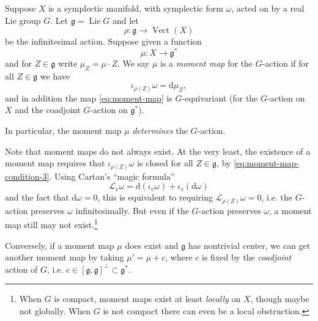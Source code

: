 \documentclass[12pt,letterpaper,reqno]{article}
\numberwithin{equation}{section}
\newcommand{\fg}{{\mathfrak g}}
\newcommand{\cL}{\ensuremath{\mathcal L}}
\newcommand{\de}{\mathrm{d}}
\newcommand{\ti}[1]{\textit{#1}}
\DeclareMathOperator{\Lie}{Lie}
\DeclareMathOperator{\Vect}{Vect}
\begin{document}
\begin{defn} \label{def:moment-map}
Suppose $X$ is a symplectic manifold, with symplectic form $\omega$,
acted on by a real Lie group $G$. Let $\fg = \Lie G$ and let
\begin{equation}
\rho: \fg \to \Vect(X)
\end{equation}
be the infinitesimal action.
Suppose given a function
\begin{equation} \label{eq:moment-map}
 \mu: X \to \fg^*
\end{equation}
and for $Z \in \fg$ write $\mu_Z = \mu \cdot Z$.
We say $\mu$ is a \ti{moment map} for the $G$-action if
for all $Z \in \fg$ we have
\begin{equation} \label{eq:moment-map-condition-3}
  \iota_{\rho(Z)} \omega = \de \mu_Z,
\end{equation}
and in addition the map \eqref{eq:moment-map} is $G$-equivariant
(for the $G$-action on $X$ and the coadjoint $G$-action on $\fg^*$).
\end{defn}
In particular, the moment map $\mu$
\ti{determines} the $G$-action.

Note that moment maps do not always exist.
At the very least, the existence of a moment
map requires that $\iota_{\rho(Z)} \omega$ is closed
for all $Z \in \fg$, by \eqref{eq:moment-map-condition-3}. Using
Cartan's ``magic formula''
\begin{equation} \label{eq:cartan-magic-formula}
  \cL_v \omega = \de (\iota_v \omega) + \iota_v (\de \omega)
\end{equation}
and the fact that $\de \omega = 0$,
this is equivalent to requiring $\cL_{\rho(Z)}\omega = 0$,
i.e. the $G$-action preserves $\omega$ infinitesimally.
But even if the $G$-action preserves $\omega$,
a moment map still may not exist.\footnote{When $G$ is compact,
moment maps exist at least
\ti{locally} on $X$, though maybe not globally. When $G$ is not
compact there can even be a local obstruction.}

Conversely, if a moment map $\mu$ does exist and $\fg$
has nontrivial center, we can get another moment map by taking
$\mu' = \mu + c$, where $c$ is fixed by the \ti{coadjoint}
action of $G$, i.e. $c \in [\fg,\fg]^\perp \subset \fg^*$.
\end{document}
